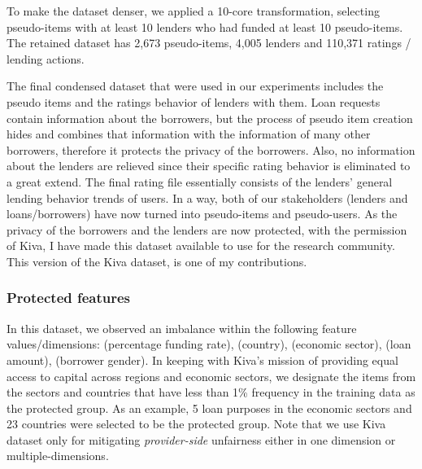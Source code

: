     To make the dataset denser, we applied a 10-core transformation, selecting pseudo-items with at least 10 lenders who had funded at least 10 pseudo-items. The retained dataset has 2,673 pseudo-items, 4,005 lenders and 110,371 ratings / lending actions.
    

    The final condensed dataset that were used in our experiments includes the pseudo items and the ratings behavior of lenders with them. Loan requests contain information about the borrowers, but the process of pseudo item creation hides and combines that information with the information of many other borrowers, therefore it protects the privacy of the borrowers. Also, no information about the lenders are relieved since their specific rating behavior is eliminated to a great extend. The final rating file essentially consists of the lenders' general lending behavior trends of users. In a way, both of our stakeholders (lenders and loans/borrowers) have now turned into pseudo-items and pseudo-users.
    As the privacy of the borrowers and the lenders are now protected, with the permission of Kiva, I have made this dataset available to use for the research community. This version of the Kiva dataset, is one of my contributions.


        \subsubsection{Protected features}
        In this dataset, we observed an imbalance within the following feature values/dimensions: (percentage funding rate), (country), (economic sector), (loan amount), (borrower gender). In keeping with Kiva's mission of providing equal access to capital across regions and economic sectors, we designate the items from the sectors and countries that have less than 1\% frequency in the training data as the protected group. As an example, 5 loan purposes in the economic sectors and 23 countries were selected to be the protected group. Note that we use Kiva dataset only for mitigating \textit{provider-side} unfairness either in one dimension or multiple-dimensions.
        
